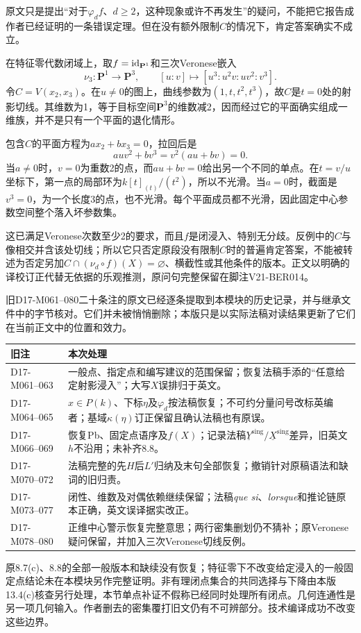 原文只是提出“对于$\varphi_d f$、$d\geq2$，这种现象或许不再发生”的疑问，不能把它报告成作者已经证明的一条错误定理。但在没有额外限制$C$的情况下，肯定答案确实不成立。

\begin{analysisproof}
在特征零代数闭域上，取$f=\mathrm{id}_{\mathbf P^1}$和三次Veronese嵌入
\[
\nu_3\colon\mathbf P^1\longrightarrow\mathbf P^3,
\qquad [u:v]\longmapsto[u^3:u^2v:uv^2:v^3].
\]
令$C=V(x_2,x_3)$。在$u\ne0$的图上，曲线参数为$(1,t,t^2,t^3)$，故$C$是$t=0$处的射影切线。其维数为1，等于目标空间$\mathbf P^3$的维数减2，因而经过它的平面确实组成一维族，并不是只有一个平面的退化情形。

包含$C$的平面方程为$a x_2+b x_3=0$，拉回后是
\[
a u v^2+b v^3=v^2(au+bv)=0.
\]
当$a\ne0$时，$v=0$为重数2的点，而$au+bv=0$给出另一个不同的单点。在$t=v/u$坐标下，第一点的局部环为$k[t]_{(t)}/(t^2)$，所以不光滑。当$a=0$时，截面是$v^3=0$，为一个长度3的点，也不光滑。每个平面成员都不光滑，因此固定中心参数空间整个落入坏参数集。
\end{analysisproof}

这已满足Veronese次数至少2的要求，而且$f$是闭浸入、特别无分歧。反例中的$C$与像相交并含该处切线；所以它只否定原段没有限制$C$时的普遍肯定答案，不能被转述为否定另加$C\cap(\nu_d\circ f)(X)=\varnothing$、横截性或其他条件的版本。正文以明确的译校订正代替无依据的乐观推测，原问句完整保留在脚注V21-BER014。

旧D17-M061--080二十条注的原文已经逐条提取到本模块的历史记录，并与继承文件中的字节核对。它们并未被悄悄删除；本版只是以实际法稿对读结果更新了它们在当前正文中的位置和效力。

\begin{longtable}{p{}p{}}
\toprule 旧注 & 本次处理\\\midrule\endhead
D17-M061--063 & 一般点、指定点和编写建议的范围保留；恢复法稿手添的“任意给定射影浸入”；大写$X$误排归于英文。\\
D17-M064--065 & $x\in P(k)$、下标$\eta$及$\varphi_d$按法稿恢复；不可约分量问号改标英编者；基域$\kappa(\eta)$订正保留且确认法稿也有原误。\\
D17-M066--069 & 恢复Pb、固定点语序及$f(X)$；记录法稿$\underline Y^{\mathrm{sing}}/\underline X^{\mathrm{sing}}$差异，旧英文$h$不沿用；未补齐8.8。\\
D17-M070--072 & 法稿完整的先$H$后$L'$归纳及末句全部恢复；撤销针对原稿语法和缺词的旧归责。\\
D17-M073--077 & 闭性、维数及对偶依赖继续保留；法稿\emph{que si}、\emph{lorsque}和推论链原本正确，英文误译据实改正。\\
D17-M078--080 & 正维中心警示恢复完整意思；两行密集删划仍不猜补；原Veronese疑问保留，并加入三次Veronese切线反例。\\
\bottomrule
\end{longtable}

原8.7(c)、8.8的全部一般版本和缺续没有恢复；特征零下不改变给定浸入的一般固定点结论未在本模块另作完整证明。非有理闭点集合的共同选择与下降由本版13.4(c)核查另行处理，本节单点补证不假称已经同时处理所有闭点。几何连通性是另一项几何输入。作者删去的密集覆打旧文仍有不可辨部分。技术编译成功不改变这些边界。
